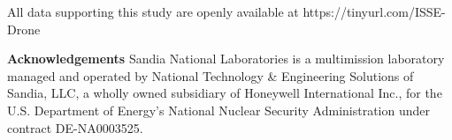 \documentclass[runningheads,a4paper]{llncs}
\begin{document}
\vspace{6 pt}
\begin{scriptsize}
	
	\par
	\noindent
	All data supporting this study are openly available at
	https://tinyurl.com/ISSE-Drone\\

	\par
	\noindent
	\textbf{Acknowledgements} Sandia National Laboratories is a multimission laboratory managed and operated by National Technology \& Engineering Solutions of Sandia, LLC, a wholly owned subsidiary of Honeywell International Inc., for the U.S. Department of Energy’s National Nuclear Security Administration under contract DE-NA0003525.
	
\end{scriptsize}




\end{document}
